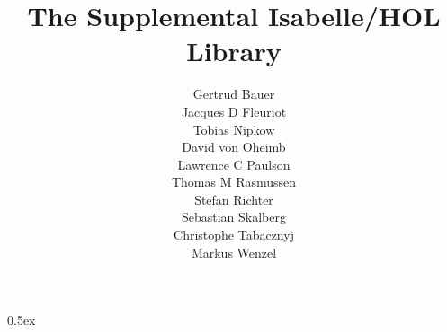 \documentclass[11pt,a4paper]{article}
\begin{document}
\title{The Supplemental Isabelle/HOL Library}
\author{
  Gertrud Bauer \\
  Jacques D Fleuriot \\
  Tobias Nipkow \\
  David von Oheimb \\
  Lawrence C Paulson \\
  Thomas M Rasmussen \\
  Stefan Richter \\
  Sebastian Skalberg \\
  Christophe Tabacznyj \\
  Markus Wenzel}
\maketitle

\tableofcontents
\newpage

\renewcommand{\isamarkupheader}[1]%
{\section{\isabellecontext: #1}\markright{THEORY~``\isabellecontext''}}

\parindent 0pt \parskip 0.5ex


\pagestyle{headings}


\end{document}
